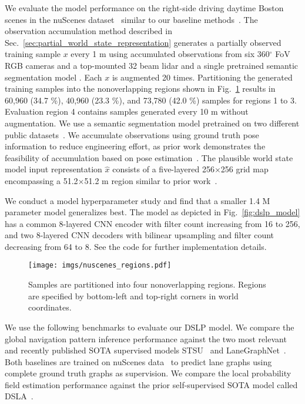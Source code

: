 \documentclass[letterpaper, 10 pt, conference]{ieeeconf}
\begin{document}
We evaluate the model performance on the right-side driving daytime Boston scenes in the nuScenes dataset~\cite{caesar2020nuscenes} similar to our baseline methods~\cite{can2021stsu, zurn2021lanegraphnet}.
The observation accumulation method described in Sec.~\ref{sec:partial_world_state_representation} generates a partially observed training sample $x$ every 1 m using accumulated observations from six 360$^{\circ}$ FoV RGB cameras and a top-mounted 32 beam lidar and a single pretrained semantic segmentation model \cite{karlsson2023pred_wm}. Each $x$ is augmented 20 times. Partitioning the generated training samples into the nonoverlapping regions shown in Fig.~\ref{fig:nuscenes_regions} results in 60,960 (34.7 \%), 40,960 (23.3 \%), and 73,780 (42.0 \%) samples for regions 1 to 3. Evaluation region 4 contains samples generated every 10 m without augmentation. We use a semantic segmentation model pretrained on two different public datasets~\cite{karlsson2023pred_wm}. We accumulate observations using ground truth pose information to reduce engineering effort, as prior work demonstrates the feasibility of accumulation based on pose estimation~\cite{karlsson2023pred_wm}. The plausible world state model input representation $\hat{x}$ consists of a five-layered 256$\times$256 grid map encompassing a 51.2$\times$51.2 m region similar to prior work~\cite{zurn2021lanegraphnet}. 


We conduct a model hyperparameter study and find that a smaller 1.4 M parameter model generalizes best. The model as depicted in Fig.~\ref{fig:dslp_model} has a common 8-layered CNN encoder with filter count increasing from 16 to 256, and two 8-layered CNN decoders with bilinear upsampling and filter count decreasing from 64 to 8.
See the code for further implementation details.

\begin{figure}[t]\centering
\texttt{[image: imgs/nuscenes\_regions.pdf]}
\caption{Samples are partitioned into four nonoverlapping regions. Regions are specified by bottom-left and top-right corners in world coordinates.}
\label{fig:nuscenes_regions}
\vspace{-6mm}
\end{figure}

We use the following benchmarks to evaluate our DSLP model. We compare the global navigation pattern inference performance against the two most relevant and recently published SOTA supervised models STSU~\cite{can2021stsu} and LaneGraphNet~\cite{zurn2021lanegraphnet}. Both baselines are trained on nuScenes data~\cite{caesar2020nuscenes} to predict lane graphs using complete ground truth graphs as supervision. We compare the local probability field estimation performance against the prior self-supervised SOTA model called DSLA~\cite{karlsson2020dsla}.
\end{document}
